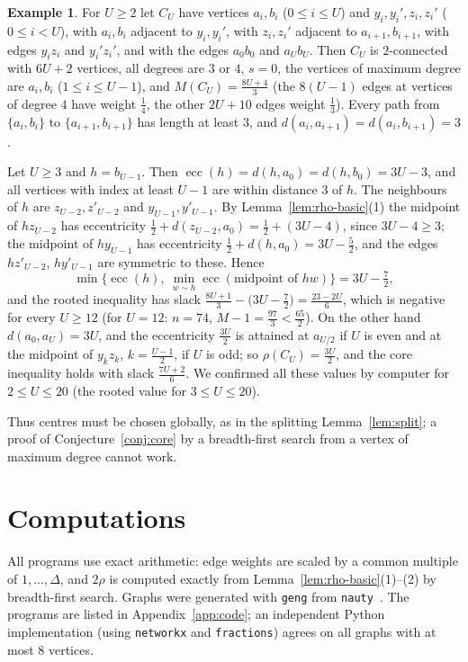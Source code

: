 \documentclass[11pt]{amsart}
\theoremstyle{definition}
\newtheorem{example}[theorem]{Example}
\newcommand{\ecc}{\operatorname{ecc}}
\begin{document}
\begin{example}\label{ex:chain}
For $U\ge2$ let $C_U$ have vertices $a_i,b_i$ ($0\le i\le U$) and $y_i,y_i',z_i,z_i'$ ($0\le i<U$), with
$a_i,b_i$ adjacent to $y_i,y_i'$, with $z_i,z_i'$ adjacent to $a_{i+1},b_{i+1}$, with edges $y_iz_i$ and $y_i'z_i'$, and
with the edges $a_0b_0$ and $a_Ub_U$. Then $C_U$ is $2$-connected with $6U+2$ vertices, all degrees are $3$ or $4$,
$s=0$, the vertices of maximum degree are $a_i,b_i$ ($1\le i\le U-1$), and $M(C_U)=\frac{8U+4}3$ (the $8(U-1)$ edges
at vertices of degree $4$ have weight $\frac14$, the other $2U+10$ edges weight $\frac13$). Every path from
$\{a_i,b_i\}$ to $\{a_{i+1},b_{i+1}\}$ has length at least $3$, and $d(a_i,a_{i+1})=d(a_i,b_{i+1})=3$.

Let $U\ge3$ and $h=b_{U-1}$. Then $\ecc(h)=d(h,a_0)=d(h,b_0)=3U-3$, and all vertices with index at least $U-1$ are
within distance $3$ of $h$. The neighbours of $h$ are $z_{U-2},z'_{U-2}$ and $y_{U-1},y'_{U-1}$. By
Lemma~\ref{lem:rho-basic}(1) the midpoint of $hz_{U-2}$ has eccentricity $\frac12+d(z_{U-2},a_0)=\frac12+(3U-4)$, since
$3U-4\ge3$; the midpoint of $hy_{U-1}$ has eccentricity $\frac12+d(h,a_0)=3U-\frac52$, and the edges $hz'_{U-2}$,
$hy'_{U-1}$ are symmetric to these. Hence
\[
\min\{\ecc(h),\ \min_{w\sim h}\ecc(\text{midpoint of }hw)\}=3U-\tfrac72 ,
\]
and the rooted inequality has slack $\frac{8U+1}3-\bigl(3U-\frac72\bigr)=\frac{23-2U}6$, which is negative for every
$U\ge12$ (for $U=12$: $n=74$, $M-1=\frac{97}3<\frac{65}2$). On the other hand $d(a_0,a_U)=3U$, and the eccentricity
$\frac{3U}2$ is attained at $a_{U/2}$ if $U$ is even and at the midpoint of $y_kz_k$, $k=\frac{U-1}2$, if $U$ is odd;
so $\rho(C_U)=\frac{3U}2$, and the core inequality holds with slack $\frac{7U+2}6$. We confirmed all these values by
computer for $2\le U\le20$ (the rooted value for $3\le U\le20$).
\end{example}

Thus centres must be chosen globally, as in the splitting Lemma~\ref{lem:split}; a proof of
Conjecture~\ref{conj:core} by a breadth-first search from a vertex of maximum degree cannot work.

\section{Computations}\label{sec:comp}

All programs use exact arithmetic: edge weights are scaled by a common multiple of $1,\dots,\Delta$, and $2\rho$ is
computed exactly from Lemma~\ref{lem:rho-basic}(1)--(2) by breadth-first search. Graphs were generated with
\texttt{geng} from \texttt{nauty}~\cite{nauty}. The programs are listed in Appendix~\ref{app:code}; an independent
Python implementation (using \texttt{networkx} and \texttt{fractions}) agrees on all graphs with at most $8$ vertices.
\end{document}
